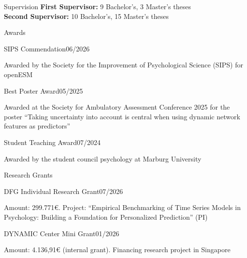 \documentclass{resume} %
\begin{document}
\begin{rSection}{Supervision}
\textbf{First Supervisor:} 9 Bachelor's, 3 Master's theses  \\
\textbf{Second Supervisor:} 10 Bachelor's, 15 Master's theses
\end{rSection}
    


\begin{rSection}{Awards}


\begin{rSubsection}{SIPS Commendation}{06/2026}{}
\item Awarded by the Society for the Improvement of Psychological Science (SIPS) for openESM
\end{rSubsection}

\begin{rSubsection}{Best Poster Award}{05/2025}{}
\item Awarded at the Society for Ambulatory Assessment Conference 2025 for the poster ``Taking uncertainty into account is central when using dynamic network features as predictors''    
\end{rSubsection}

\begin{rSubsection}{Student Teaching Award}{07/2024}{}
\item Awarded by the student council psychology at Marburg University 
\end{rSubsection}
\end{rSection}


\begin{rSection}{Research Grants}
\begin{rSubsection}{DFG Individual Research Grant}{07/2026}{}
\item Amount: 299.771€. Project: ``Empirical Benchmarking of Time Series Models in Psychology: Building a Foundation for Personalized Prediction'' (PI)
\end{rSubsection}  

\begin{rSubsection}{DYNAMIC Center Mini Grant}{01/2026}{}
\item Amount: 4.136,91€ (internal grant). Financing research project in Singapore    
\end{rSubsection}
\end{rSection}
\end{document}
